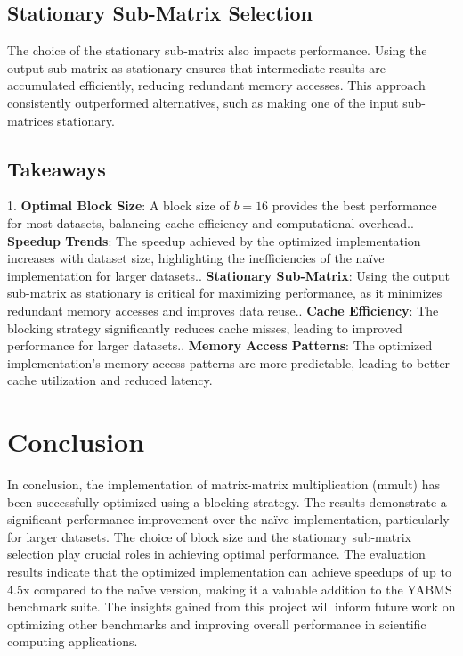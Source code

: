 \documentclass[12pt]{article}
\begin{document}
    \subsection{Stationary Sub-Matrix Selection}
    The choice of the stationary sub-matrix also impacts performance. Using the output sub-matrix as stationary ensures that intermediate results are accumulated efficiently, reducing redundant memory accesses. This approach consistently outperformed alternatives, such as making one of the input sub-matrices stationary.

    \subsection{Takeaways}
    1. \textbf{Optimal Block Size}: A block size of \( b = 16 \) provides the best performance for most datasets, balancing cache efficiency and computational overhead.. \textbf{Speedup Trends}: The speedup achieved by the optimized implementation increases with dataset size, highlighting the inefficiencies of the naïve implementation for larger datasets.. \textbf{Stationary Sub-Matrix}: Using the output sub-matrix as stationary is critical for maximizing performance, as it minimizes redundant memory accesses and improves data reuse.. \textbf{Cache Efficiency}: The blocking strategy significantly reduces cache misses, leading to improved performance for larger datasets.. \textbf{Memory Access Patterns}: The optimized implementation's memory access patterns are more predictable, leading to better cache utilization and reduced latency.




\section{Conclusion}
In conclusion, the implementation of matrix-matrix multiplication (mmult) has been successfully optimized using a blocking strategy. The results demonstrate a significant performance improvement over the naïve implementation, particularly for larger datasets. The choice of block size and the stationary sub-matrix selection play crucial roles in achieving optimal performance.
The evaluation results indicate that the optimized implementation can achieve speedups of up to 4.5x compared to the naïve version, making it a valuable addition to the YABMS benchmark suite. The insights gained from this project will inform future work on optimizing other benchmarks and improving overall performance in scientific computing applications.
\end{document}
